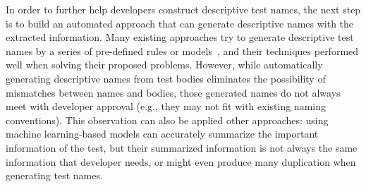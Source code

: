 In order to further help developers construct descriptive test names, the next step is to build an automated approach that can generate descriptive names with the extracted information.
%
Many existing approaches try to generate descriptive test names by a series of pre-defined rules or models~\cite{arcuri2014automated, zhang2015automatically, allamanis2015suggesting, daka2017generating, li2019deepfl}, and their techniques performed well when solving their proposed problems.
However, while automatically generating descriptive names from test bodies eliminates the possibility of mismatches between names and bodies, those generated names do not always meet with developer approval (e.g., they may not fit with existing naming conventions).
%
This observation can also be applied other approaches: using machine learning-based models can accurately summarize the important information of the test, but their summarized information is not always the same information that developer needs, or might even produce many duplication when generating test names. 


